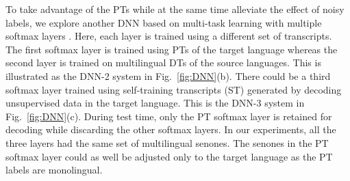 \documentclass[a4paper]{article}
\begin{document}
To take advantage of the PTs while at the same time alleviate the effect of noisy labels, we explore another DNN based on multi-task learning with multiple softmax layers \cite{Seltzer-MTLPhonemeRecog}. Here, each layer is trained using a different set of transcripts. The first softmax layer is trained using PTs of the target language whereas the second layer is trained on multilingual DTs of the source languages. This is illustrated as the DNN-2 system in Fig.~\ref{fig:DNN}(b). There could be a third softmax layer trained using self-training transcripts (ST) generated by decoding unsupervised data in the target language. This is the DNN-3 system in Fig.~\ref{fig:DNN}(c). During test time, only the PT softmax layer is retained for decoding while discarding the other softmax layers. In our experiments, all the three layers had the same set of multilingual senones. The senones in the PT softmax layer could as well be adjusted only to the target language as the PT labels are monolingual.
\end{document}
